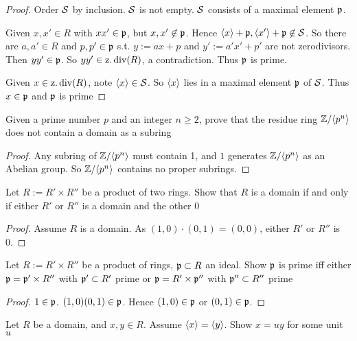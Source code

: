 \documentclass[11pt]{article}
\begin{document}
\begin{proof}
Order \(\mathcal{S}\) by inclusion. \(\mathcal{S}\) is not empty. \(\mathcal{S}\) consists of a
maximal element \(\mathfrak{p}\).

Given \(x,x'\in R\) with \(xx'\in\mathfrak{p}\), but \(x,x'\not\in\mathfrak{p}\). Hence \(\langle
   x\rangle+\mathfrak{p},\langle x'\rangle+\mathfrak{p}\not\in\mathcal{S}\). So there are \(a,a'\in R\) and
\(p,p'\in\mathfrak{p}\)  s.t. \(y:=ax+p\) and \(y':=a'x'+p'\) are not zerodivisors. Then
\(yy'\in\mathfrak{p}\). So \(yy'\in\operatorname{z.div}(R)\), a contradiction. Thus \(\mathfrak{p}\) is prime.

Given \(x\in\operatorname{z.div}(R)\), note \(\langle x\rangle\in\mathcal{S}\). So \(\langle x\rangle\) lies in a
maximal element \(\mathfrak{p}\) of \(\mathcal{S}\). Thus \(x\in\mathfrak{p}\) and \(\mathfrak{p}\) is prime
\end{proof}

\begin{exercise}
\label{2.27}
Given a prime number \(p\) and an integer \(n\ge2\), prove that the residue
ring \(\mathbb{Z}/\langle p^n\rangle\) does not contain a domain as a subring
\end{exercise}

\begin{proof}
Any subring of \(\mathbb{Z}/\langle p^n\rangle\) must contain 1, and \(1\) generates \(\mathbb{Z}/\langle
   p^n\rangle\) as an Abelian group. So \(\mathbb{Z}/\langle p^n\rangle\) contains no proper subrings.
\end{proof}

\begin{exercise}
\label{2.28}
Let \(R:=R'\times R''\) be a product of two rings. Show that \(R\) is a
domain if and only if either \(R'\) or \(R''\) is a domain and the other 0
\end{exercise}

\begin{proof}
Assume \(R\) is a domain. As \((1,0)\cdot(0,1)=(0,0)\), either \(R'\) or
\(R''\) is 0.
\end{proof}

\begin{exercise}
\label{2.29}
Let \(R:=R'\times R''\) be a product of rings, \(\mathfrak{p}\subset R\) an ideal.
Show \(\mathfrak{p}\) is prime iff either \(\mathfrak{p}=\mathfrak{p}'\times R''\) with \(\mathfrak{p}'\subset
   R'\) prime or \(\mathfrak{p}=R'\times\mathfrak{p}''\) with \(\mathfrak{p}''\subset R''\) prime
\end{exercise}

\begin{proof}
\(1\in\mathfrak{p}\). \((1,0)(0,1)\in\mathfrak{p}\). Hence \((1,0)\in\mathfrak{p}\) or \((0,1)\in\mathfrak{p}\).
\end{proof}

\begin{exercise}
\label{2.30}
Let \(R\) be a domain, and \(x,y\in R\). Assume \(\langle x\rangle=\langle y\rangle\). Show
\(x=uy\) for some unit \(u\)
\end{exercise}
\end{document}
